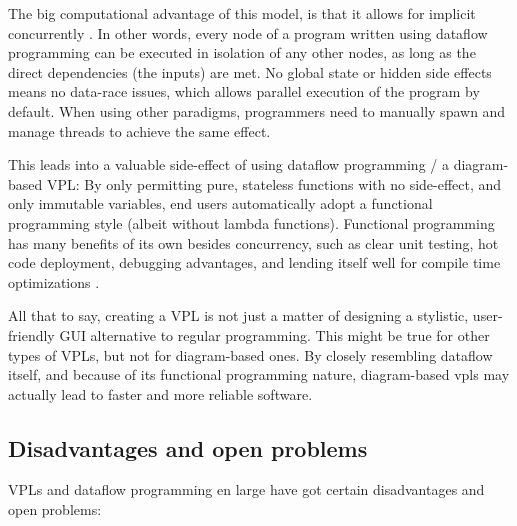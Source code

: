 The big computational advantage of this model, is that it allows for implicit concurrently \citep{sousa_dataflow_2012}. 
In other words, every node of a program written using dataflow programming can be executed in isolation of any other nodes, as long as the direct dependencies (the inputs) are met. 
No global state or hidden side effects means no data-race issues, which allows parallel execution of the program by default.
When using other paradigms, programmers need to manually spawn and manage threads to achieve the same effect. 

This leads into a valuable side-effect of using dataflow programming / a diagram-based \ac{VPL}: 
By only permitting pure, stateless functions with no side-effect, and only immutable variables, end users automatically adopt a functional programming style (albeit without lambda functions).
Functional programming has many benefits of its own besides concurrency, such as clear unit testing, hot code deployment, debugging advantages, and lending itself well for compile time optimizations \citep{akhmechet_functional_2006, elliott_tangible_2007}.




All that to say, creating a \ac{VPL} is not just a matter of designing a stylistic, user-friendly \ac{GUI} alternative to regular programming.
This might be true for other types of VPLs, but not for diagram-based ones. 
By closely resembling dataflow itself, and because of its functional programming nature, diagram-based vpls may actually lead to faster and more reliable software.

\subsection{Disadvantages and open problems}
\label{sec:background:vpl:disadvantages}
 
\ac{VPL}s and dataflow programming en large have got certain disadvantages and open problems:

